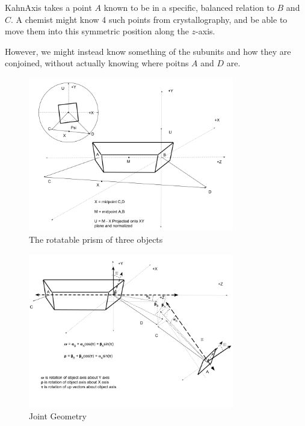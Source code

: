 \documentclass[11pt]{article}
\begin{document}
{KahnAxis takes a point $A$ known to be in a specific, balanced relation
to $B$ and $C$. A chemist might know 4 such points from crystallography,
and be able to move them into this symmetric position along the $z$-axis.

However, we might instead know something of the subunits and
how they are conjoined, without actually knowing where poitns $A$
and $D$ are.


\begin{figure}
     \centering
     \includegraphics[width=0.80\textwidth]{figures/ObjectForStackingSetup.png}
     \caption{The rotatable prism of three objects}
  \label{fig:intrinsicdiagram}
\end{figure}

\begin{figure}
     \centering
     \includegraphics[width=0.80\textwidth]{figures/JointGeometry.png}
     \caption{Joint Geometry}
  \label{fig:jointdiagram}
\end{figure}


}
\end{document}
